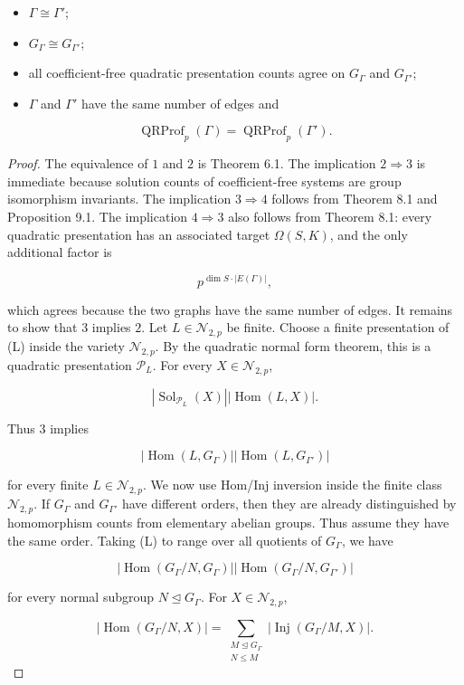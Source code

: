 \documentclass[11pt]{article}
\begin{document}
\begin{itemize}
\item $\Gamma\cong\Gamma'$;
\item $G_\Gamma\cong G_{\Gamma'}$;
\item all coefficient-free quadratic presentation counts agree on $G_\Gamma$ and $G_{\Gamma'}$;
\item $\Gamma$ and $\Gamma'$ have the same number of edges and
\end{itemize}

\[
\operatorname{QRProf}_p(\Gamma)=
\operatorname{QRProf}_p(\Gamma').
\]

\begin{proof}
The equivalence of $1$ and $2$ is Theorem 6.1. The implication $2$$\Rightarrow$$3$ is immediate because solution counts of coefficient-free systems are group isomorphism invariants. The implication $3$$\Rightarrow$$4$ follows from Theorem 8.1 and Proposition 9.1. The implication $4$$\Rightarrow$$3$ also follows from Theorem 8.1: every quadratic presentation has an associated target $\Omega(S,K)$, and the only additional factor is

\[
p^{\dim S\cdot |E(\Gamma)|},
\]

which agrees because the two graphs have the same number of edges. It remains to show that $3$ implies $2$. Let $L\in\mathcal N_{2,p}$ be finite. Choose a finite presentation of (L) inside the variety $\mathcal N_{2,p}$. By the quadratic normal form theorem, this is a quadratic presentation $\mathcal P_L$. For every $X\in\mathcal N_{2,p}$,

\[
|\operatorname{Sol}_{\mathcal P_L}(X)|
|\operatorname{Hom}(L,X)|.
\]

Thus $3$ implies

\[
|\operatorname{Hom}(L,G_\Gamma)|
|\operatorname{Hom}(L,G_{\Gamma'})|
\]

for every finite $L\in\mathcal N_{2,p}$. We now use Hom/Inj inversion inside the finite class $\mathcal N_{2,p}$. If $G_\Gamma$ and $G_{\Gamma'}$ have different orders, then they are already distinguished by homomorphism counts from elementary abelian groups. Thus assume they have the same order. Taking (L) to range over all quotients of $G_\Gamma$, we have

\[
|\operatorname{Hom}(G_\Gamma/N,G_\Gamma)|
|\operatorname{Hom}(G_\Gamma/N,G_{\Gamma'})|
\]

for every normal subgroup $N\trianglelefteq G_\Gamma$. For $X\in\mathcal N_{2,p}$,

\[
|\operatorname{Hom}(G_\Gamma/N,X)|
=
\sum_{\substack{M\trianglelefteq G_\Gamma\\ N\le M}}
|\operatorname{Inj}(G_\Gamma/M,X)|.
\]


\end{proof}
\end{document}
